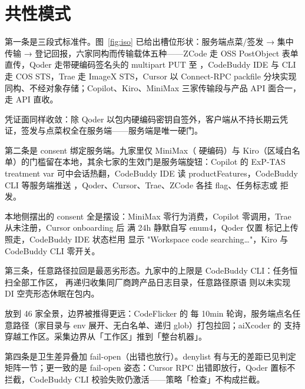 \section{共性模式}

第一条是三段式标准件。图~\ref{fig:iso} 已给出槽位形状：服务端点菜/签发 → 集中传输 → 登记回报，六家同构而传输载体五种——ZCode 走 OSS PostObject 表单直传，Qoder 走带硬编码签名头的 multipart PUT 至 ，CodeBuddy IDE 与 CLI 走 COS STS，Trae 走 ImageX STS，Cursor 以 Connect-RPC packfile 分块实现同构、不经对象存储；Copilot、Kiro、MiniMax 三家传输段与产品 API 面合一，走 API 直收。

凭证面同样收敛：除 Qoder 以包内硬编码密钥自签外，客户端从不持长期云凭证，签发与点菜权全在服务端——服务端是唯一硬门。

第二条是 consent 绑定服务端。九家里仅 MiniMax（ 硬编码）与 Kiro（区域白名单）的门槛留在本地，其余七家的生效门是服务端旋钮：Copilot 的 ExP-TAS treatment var 可中会话热翻，CodeBuddy IDE 读 productFeatures，CodeBuddy CLI 等服务端推送 ，Qoder、Cursor、Trae、ZCode 各挂 flag、任务标志或  拒发。

本地侧摆出的 consent 全是摆设：MiniMax  零行为消费，Copilot  零调用，Trae  从未注册，Cursor onboarding 后  满 24h 静默自写 enum4，Qoder  仅置  标记上传照走，CodeBuddy IDE 状态栏用  显示 "Workspace code searching…"，Kiro 与 CodeBuddy CLI 零开关。

第三条，任意路径拉回是最恶劣形态。九家中的上限是 CodeBuddy CLI：任务恒  扫全部工作区， 再递归收集同厂商跨产品日志目录，任意路径原语  则以未实现 DI 空壳形态休眠在包内。

放到 46 家全景，边界被推得更远：CodeFlicker 的  每 10min 轮询，服务端点名任意路径（家目录与 env 展开、无白名单、递归 glob）打包拉回；aiXcoder 的  支持  穿越工作区。采集边界从「工作区」推到「整台机器」。

第四条是卫生差异叠加 fail-open（出错也放行）。denylist 有与无的差距已见判定矩阵一节；更一致的是 fail-open 姿态：Cursor  RPC 出错即放行，Qoder  置标不拦截，CodeBuddy CLI  校验失败仍激活——策略「检查」不构成拦截。

